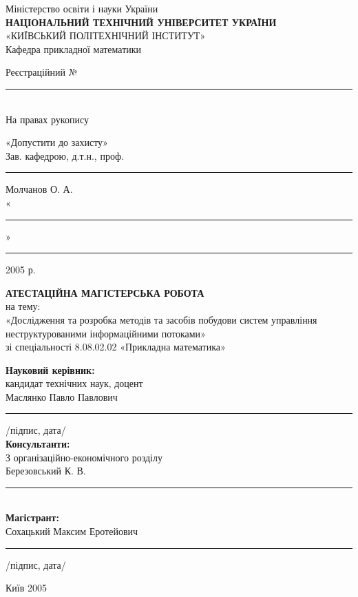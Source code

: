 \documentclass{memoir}
\begin{document}
\begin{center}
    \vspace*{1cm}
    {\small Міністерство освіти і науки України}\\[0.3cm]
    {\large \textbf{НАЦІОНАЛЬНИЙ ТЕХНІЧНИЙ УНІВЕРСИТЕТ УКРАЇНИ}}\\[0.3cm]
    {\large «КИЇВСЬКИЙ ПОЛІТЕХНІЧНИЙ ІНСТИТУТ»}\\[0.5cm]
    {\normalsize Кафедра прикладної математики}\\[0.5cm]
    {\small Реєстраційний № \rule{3cm}{0.4pt}}\\[1cm]
    {\small На правах рукопису}\\[1cm]
    \begin{flushright}
        \parbox{0.45\textwidth}{
            \raggedright
            «Допустити до захисту»\\
            Зав. кафедрою, д.т.н., проф.\\
            \rule{2cm}{0.4pt} Молчанов О. А.\\
            «\rule{1cm}{0.4pt}» \rule{2cm}{0.4pt} 2005 р.
        }
    \end{flushright}
    \vspace{1cm}
    {\Large \textbf{АТЕСТАЦІЙНА МАГІСТЕРСЬКА РОБОТА}}\\[0.5cm]
    {\normalsize на тему:}\\[0.3cm]
    {\large «Дослідження та розробка методів та засобів побудови систем управління неструктурованими інформаційними потоками»}\\[0.5cm]
    {\normalsize зі спеціальності 8.08.02.02 «Прикладна математика»}\\[0.5cm]
    \begin{flushleft}
        \parbox{\textwidth}{
            \raggedright
            \textbf{Науковий керівник:}\\
            кандидат технічних наук, доцент\\
            Маслянко Павло Павлович\\
            \rule{3cm}{0.4pt} \hfill /підпис, дата/\\[0.5cm]
            \textbf{Консультанти:}\\
            З організаційно-економічного розділу\\
            Березовський К. В.\\
            \rule{3cm}{0.4pt}\\[0.5cm]
            \textbf{Магістрант:}\\
            Сохацький Максим Еротейович\\
            \rule{3cm}{0.4pt} \hfill /підпис, дата/
        }
    \end{flushleft}
    \vfill
    {\normalsize Київ 2005}
\end{center}
\end{document}
